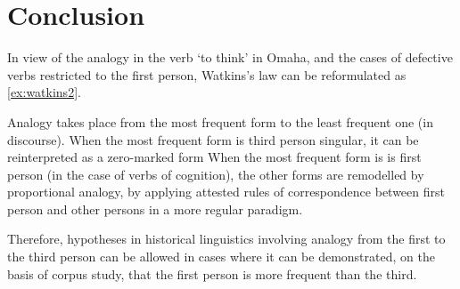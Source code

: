 \documentclass[oldfontcommands,oneside,a4paper,11pt]{article}
\newcommand{\ipa}[1]{{\phon#1}} %
\begin{document}
%
%
%

\section{Conclusion}
In view of the analogy in the verb `to think' in Omaha, and the cases of defective verbs restricted to the first person, Watkins's law can be reformulated as \ref{ex:watkins2}.

\begin{exe}
\ex  \label{ex:watkins2}
\glt Analogy takes place from the most frequent form to the least frequent one (in discourse). 
\glt When the most frequent form is third person singular, it can be reinterpreted as a zero-marked form
\glt  When the most frequent form is  is first person (in the case of verbs of cognition), the other forms are remodelled by proportional analogy, by applying attested rules of correspondence between first person and other persons in a more regular paradigm.
\end{exe}

Therefore, hypotheses in historical linguistics involving analogy from the first to the  third person can be allowed in cases where it can be demonstrated, on the basis of corpus study, that the first person is more frequent than the third.
 
 


\end{document}
